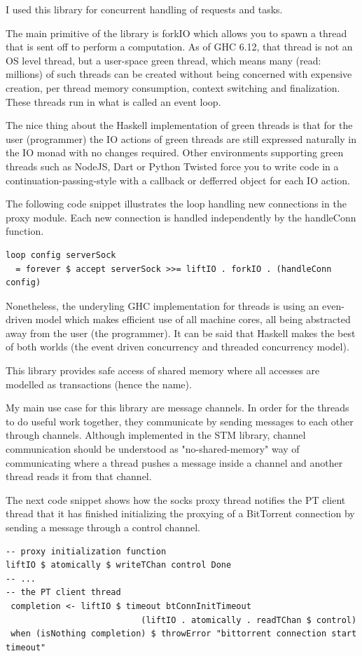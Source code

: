 \documentclass[11pt]{book} %
\begin{document}

I used this library for concurrent handling of requests and tasks.

The main primitive of the library is forkIO which allows you to spawn a thread that is sent off to perform a computation. As of GHC 6.12, that thread is not an OS level thread, but a user-space green thread, which means many (read: millions) of such threads can be created without being concerned with expensive creation, per thread memory consumption, context switching and finalization. These threads run in what is called an event loop.

The nice thing about the Haskell implementation of green threads is that for the user (programmer) the IO actions of green threads are still expressed naturally in the IO monad with no changes required. Other environments supporting green threads such as NodeJS, Dart or Python Twisted force you to write code in a continuation-passing-style with a callback or defferred object for each IO action. 

The following code snippet illustrates the loop handling new connections in the proxy module. Each new connection is handled independently by the handleConn function.

\begin{lstlisting}
loop config serverSock
  = forever $ accept serverSock >>= liftIO . forkIO . (handleConn config)
\end{lstlisting}

Nonetheless, the underyling GHC implementation for threads is using an even-driven model which makes efficient use of all machine cores, all being abstracted away from the user (the programmer). It can be said that Haskell makes the best of both worlds (the event driven concurrency and threaded concurrency model).

This library provides safe access of shared memory where all accesses are modelled as transactions (hence the name).

My main use case for this library are message channels. In order for the threads to do useful work together, they communicate by sending messages to each other through channels. Although implemented in the STM library, channel communication should be understood as "no-shared-memory" way of communicating where a thread pushes a message inside a channel and another thread reads it from that channel.

The next code snippet shows how the socks proxy thread notifies the PT client thread that it has finished initializing the proxying of a BitTorrent connection by sending a message through a control channel.
\begin{lstlisting}
-- proxy initialization function
liftIO $ atomically $ writeTChan control Done
-- ...
-- the PT client thread 
 completion <- liftIO $ timeout btConnInitTimeout
		                   (liftIO . atomically . readTChan $ control)
 when (isNothing completion) $ throwError "bittorrent connection start timeout"
\end{lstlisting}
\end{document}
